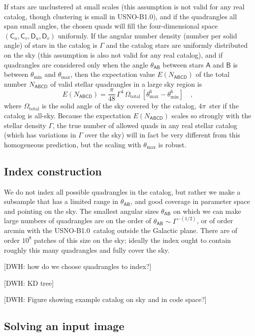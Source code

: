 \documentclass[12pt,preprint]{aastex}
\newcommand{\usnob}{USNO-B1.0}
\newcommand{\starlabel}[1]{\mathsf{#1}}
\newcommand{\AAA}{\starlabel{A}}
\newcommand{\BBB}{\starlabel{B}}
\newcommand{\CCC}{\starlabel{C}}
\newcommand{\DDD}{\starlabel{D}}
\newcommand{\NABCD}{N_{\AAA\BBB\CCC\DDD}}
\newcommand{\ENABCD}{E(\NABCD)}
\newcommand{\thetaAB}{\theta_{\AAA\BBB}}
\newcommand{\thetamin}{\theta_\mathrm{min}}
\newcommand{\thetamax}{\theta_\mathrm{max}}
\begin{document}
If stars are unclustered at small scales (this assumption is not valid
for any real catalog, though clustering is small in \usnob), and if
the quadrangles all span small angles, the chosen quads will fill the
four-dimensional space $(\CCC_u,\CCC_v,\DDD_u,\DDD_v)$ uniformly.  If
the angular number density (number per solid angle) of stars in the
catalog is $\Gamma$ and the catalog stars are uniformly distributed on
the sky (this assumption is also not valid for any real catalog), and
if quadrangles are considered only when the angle $\thetaAB$ between
stars $\AAA$ and $\BBB$ is between $\thetamin$ and $\thetamax$, then
the expectation value $\ENABCD$ of the total number $\NABCD$ of valid
stellar quadrangles in a large sky region is
\begin{equation}
\ENABCD = \frac{\pi}{48}\,\Gamma^4\,\Omega_\mathrm{total}\,
  [\thetamax^6-\thetamin^6] \quad ,
\end{equation}
where $\Omega_\mathrm{total}$ is the solid angle of the sky covered by
the catalog, $4\pi$~ster if the catalog is all-sky.  Because the
expectation $\ENABCD$ scales so strongly with the stellar density
$\Gamma$, the true number of allowed quads in any real stellar catalog
(which has variations in $\Gamma$ over the sky) will in fact be very
different from this homogeneous prediction, but the scaling with
$\thetamax$ is robust.

\subsection{Index construction}

We do not index all possible quadrangles in the catalog, but rather we
make a subsample that has a limited range in $\thetaAB$, and good
coverage in parameter space and pointing on the sky.  The smallest
angular sizes $\thetaAB$ on which we can make large numbers of
quadrangles are on the order of $\thetaAB\sim\Gamma^{-(1/2)}$, or of
order arcmin with the \usnob\ catalog outside the Galactic plane.
There are of order $10^8$ patches of this size on the sky; ideally the
index ought to contain roughly this many quadrangles and fully cover
the sky.

[DWH: how do we choose quadrangles to index?]

[DWH: KD tree]

[DWH: Figure showing example catalog on sky and in code space?]

\subsection{Solving an input image}
\end{document}
